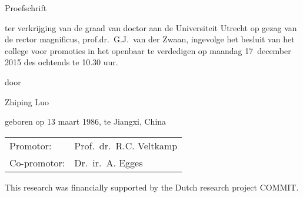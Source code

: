 \begin{titlepage}
\vfill
\begin{center}
\noindent\LARGE Proefschrift
\par
\bigskip
\par\noindent\normalsize  ter verkrijging van de graad van doctor aan de Universiteit Utrecht op gezag van de rector magnificus, prof.dr.~G.J.~van der Zwaan, ingevolge het besluit van het college voor promoties in het openbaar te verdedigen op maandag 17~december 2015 des
ochtends te 10.30 uur.
\end{center}
\vspace*{1ex}
\begin{center}
\noindent
door
\end{center}

\vspace*{1ex}

\begin{center}
\LARGE Zhiping Luo
\par
\bigskip
\par\noindent\normalsize geboren op 13 maart 1986, te Jiangxi, China
\end{center}

\newpage
\thispagestyle{empty}%
\noindent
\begin{tabular}{ll}
Promotor: & Prof.~dr.~R.C. Veltkamp\\
Co-promotor: & Dr.~ir.~A. Egges\\
\end{tabular}%

\vfill

\medskip

\noindent
	This research was financially supported by the Dutch research project COMMIT.

\end{titlepage}
